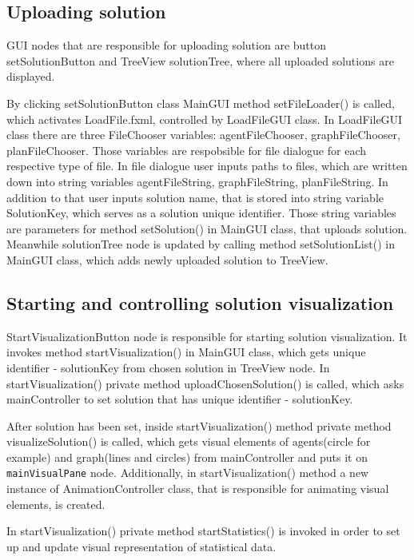 \documentclass[thesis=B,english]{FITthesis}[2019/12/23]
\begin{document}
\subsection{Uploading solution}

GUI nodes that are responsible for uploading solution are button setSolutionButton and TreeView solutionTree, where all uploaded solutions are displayed.

By clicking setSolutionButton class MainGUI method setFileLoader() is called, which activates LoadFile.fxml, controlled by LoadFileGUI class. In LoadFileGUI class there are three FileChooser variables: agentFileChooser, graphFileChooser, planFileChooser. Those variables are respobsible for file dialogue for each respective type of file. In file dialogue user inputs paths to files, which are written down into string variables agentFileString, graphFileString, planFileString. In addition to that user inputs solution name, that is stored into string variable SolutionKey, which serves as a solution unique identifier. Those string variables are parameters for method setSolution() in MainGUI class, that uploads solution. Meanwhile solutionTree node is updated by calling method setSolutionList() in MainGUI class, which adds newly uploaded solution to TreeView.

\subsection{Starting and controlling solution visualization}

StartVisualizationButton node is responsible for starting solution visualization. It invokes method startVisualization() in MainGUI class, which gets unique identifier - solutionKey from chosen solution in TreeView node. In startVisualization() private method uploadChosenSolution() is called, which asks mainController to set solution that has unique identifier - solutionKey.

After solution has been set, inside startVisualization() method private method visualizeSolution() is called, which gets visual elements of agents(circle for example) and graph(lines and circles) from mainController and puts it on \verb|mainVisualPane| node. Additionally, in startVisualization() method a new instance of AnimationController class, that is responsible for animating visual elements, is created. 

In startVisualization() private method startStatistics() is invoked in order to set up and update visual representation of statistical data.
\end{document}
